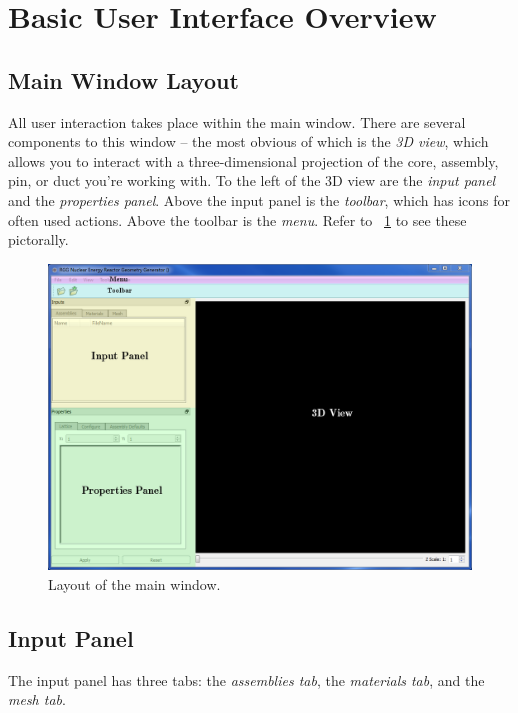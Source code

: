 \section{Basic User Interface Overview}
\subsection{Main Window Layout}
All user interaction takes place within the main window.  There are several components to this window -- the most obvious of which is the \emph{3D view}, which allows you to interact with a three-dimensional projection of the core, assembly, pin, or duct you're working with.  To the left of the 3D view are the \emph{input panel} and the \emph{properties panel}.  Above the input panel is the \emph{toolbar}, which has icons for often used actions.  Above the toolbar is the \emph{menu}. Refer to ~\ref{fig:mainwindow1} to see these pictorally.

\begin{figure}[H]
	\begin{center}
		\includegraphics[width=\linewidth]{Images/main-window-layout.png}
		\caption{Layout of the main window.}
		\label{fig:mainwindow1}
	\end{center}
\end{figure}


\subsection{Input Panel}
The input panel has three tabs: the \emph{assemblies tab}, the \emph{materials tab}, and the \emph{mesh tab}.

